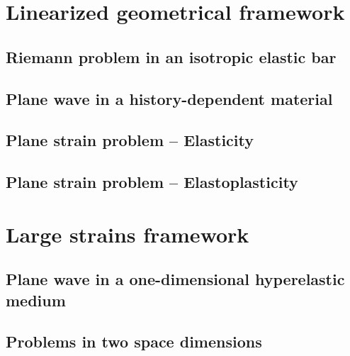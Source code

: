\section{Linearized geometrical framework}
\label{sec:hpp_simulations}

\subsection{Riemann problem in an isotropic elastic bar}
\label{subsec:hpp_bar}


\subsection{Plane wave in a history-dependent material}
\label{subsec:hpp_planewave}


\subsection{Plane strain problem -- Elasticity}
\label{subsec:el_planestrain}


\subsection{Plane strain problem -- Elastoplasticity}
\label{subsec:ep_planestrain}


\section{Large strains framework}
\label{sec:he_simulations}
\subsection{Plane wave in a one-dimensional hyperelastic medium}
\label{subsec:he_planewave}



\subsection{Problems in two space dimensions}
\label{subsec:he_plate}






